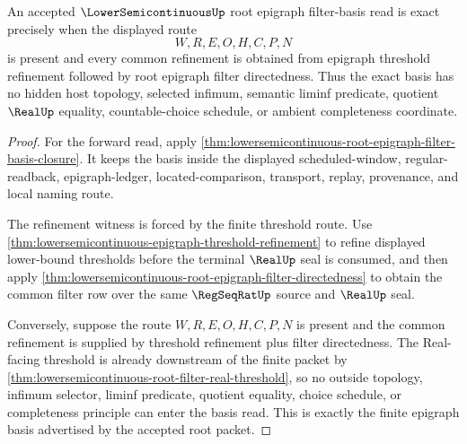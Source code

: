 \begin{theorem}
\label{thm:lowersemicontinuous-root-epigraph-filter-basis-exactness}
An accepted $\LowerSemicontinuousUp$ root epigraph filter-basis read is exact precisely when the displayed route
$$
W,R,E,O,H,C,P,N
$$
is present and every common refinement is obtained from epigraph threshold refinement followed by root epigraph filter directedness. Thus the exact basis has no hidden host topology, selected infimum, semantic liminf predicate, quotient $\RealUp$ equality, countable-choice schedule, or ambient completeness coordinate.
\end{theorem}
\begin{proof}
For the forward read, apply \autoref{thm:lowersemicontinuous-root-epigraph-filter-basis-closure}. It keeps the basis inside the displayed scheduled-window, regular-readback, epigraph-ledger, located-comparison, transport, replay, provenance, and local naming route.

The refinement witness is forced by the finite threshold route. Use \autoref{thm:lowersemicontinuous-epigraph-threshold-refinement} to refine displayed lower-bound thresholds before the terminal $\RealUp$ seal is consumed, and then apply \autoref{thm:lowersemicontinuous-root-epigraph-filter-directedness} to obtain the common filter row over the same $\RegSeqRatUp$ source and $\RealUp$ seal.

Conversely, suppose the route $W,R,E,O,H,C,P,N$ is present and the common refinement is supplied by threshold refinement plus filter directedness. The Real-facing threshold is already downstream of the finite packet by \autoref{thm:lowersemicontinuous-root-filter-real-threshold}, so no outside topology, infimum selector, liminf predicate, quotient equality, choice schedule, or completeness principle can enter the basis read. This is exactly the finite epigraph basis advertised by the accepted root packet.
\end{proof}

